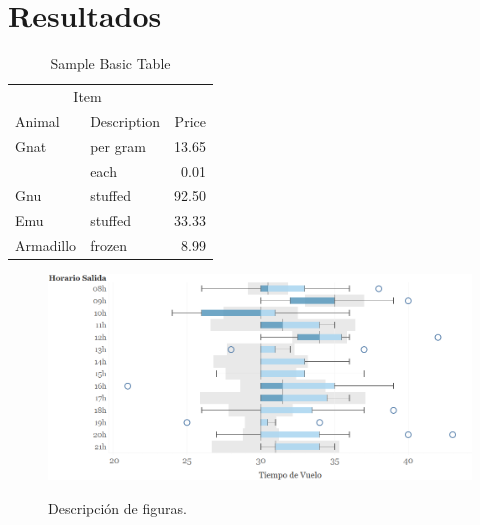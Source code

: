 
\section{Resultados}
\lipsum[1]

\begin{table}[h]
	\caption{Sample Basic Table}
	\label{tab:BasicTable}
	\begin{tabular}{@{}llr@{}}         \toprule
		\multicolumn{2}{c}{Item}        \\ \cmidrule(r){1-2}
		Animal    & Description & Price \\ \midrule
		Gnat      & per gram    & 13.65 \\
		& each        &  0.01 \\
		Gnu       & stuffed     & 92.50 \\
		Emu       & stuffed     & 33.33 \\
		Armadillo & frozen      &  8.99 \\ \bottomrule
	\end{tabular}
\end{table}

\lipsum[1]

\begin{figure}
	\caption{Descripción de figuras.}
	\includegraphics[scale=0.85]{contenido/multimedios/figura1}
	\label{fig:Figure1}
\end{figure}

\lipsum[2]

